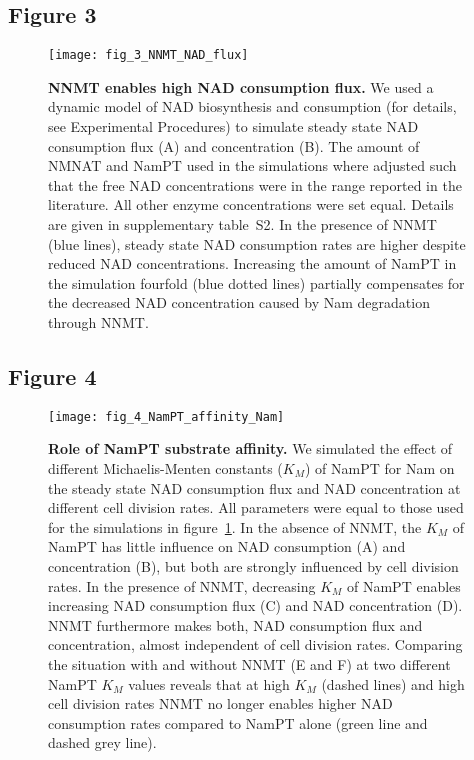 \newpage


\subsection*{Figure 3}

\begin{figure}[ht]
  \centering
  \texttt{[image: fig\_3\_NNMT\_NAD\_flux]}
  \caption{\textbf{NNMT enables high NAD consumption flux.} We used a dynamic model of NAD biosynthesis and consumption (for details, see Experimental Procedures) to simulate steady state NAD consumption flux (A) and concentration (B). The amount of NMNAT and NamPT used in the simulations where adjusted such that the free NAD concentrations were in the range reported in the literature. All other enzyme concentrations were set equal. Details are given in supplementary table~S2. In the presence of NNMT (blue lines), steady state NAD consumption rates are higher despite reduced NAD concentrations. Increasing the amount of NamPT in the simulation fourfold (blue dotted lines) partially compensates for the decreased NAD concentration caused by Nam degradation through NNMT.}
  \label{fig:NNMT_NAD_flux}
\end{figure}

\newpage


\subsection*{Figure 4}

\begin{figure}[ht]
  \centering
  \texttt{[image: fig\_4\_NamPT\_affinity\_Nam]}
  \caption{\textbf{Role of NamPT substrate affinity.} We simulated the effect of different Michaelis-Menten constants ($K_{M}$) of NamPT for Nam on the steady state NAD consumption flux and NAD concentration at different cell division rates. All parameters were equal to those used for the simulations in figure~\ref{fig:NNMT_NAD_flux}. In the absence of NNMT, the $K_{M}$ of NamPT has little influence on NAD consumption (A) and concentration (B), but both are strongly influenced by cell division rates. In the presence of NNMT, decreasing $K_{M}$ of NamPT enables increasing NAD consumption flux (C) and NAD concentration (D). NNMT furthermore makes both, NAD consumption flux and concentration, almost independent of cell division rates. Comparing the situation with and without NNMT (E and F) at two different NamPT $K_{M}$ values reveals that at high $K_{M}$ (dashed lines) and high cell division rates NNMT no longer enables higher NAD consumption rates compared to NamPT alone (green line and dashed grey line).}
  \label{fig:NamPT_affinity_Nam}
\end{figure}


